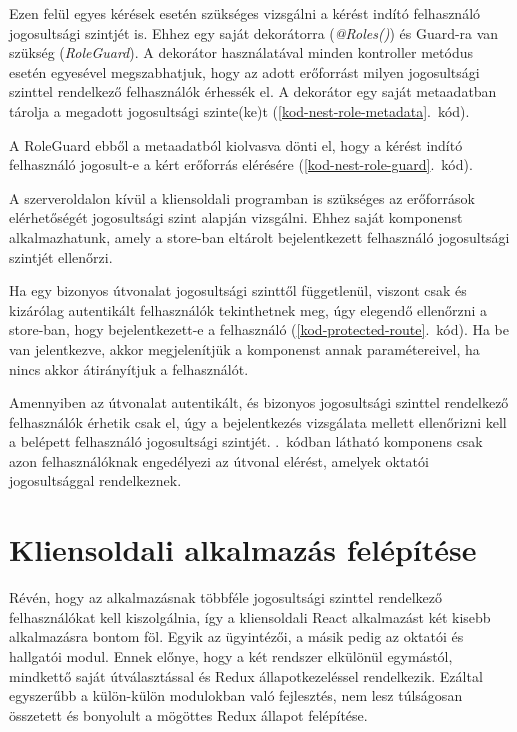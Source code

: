 \documentclass[
]{thesis-ekf}
\theoremstyle{definition}
\theoremstyle{remark}
\begin{document}
	Ezen felül egyes kérések esetén szükséges vizsgálni a kérést indító felhasználó jogosultsági szintjét is. Ehhez egy saját dekorátorra (\emph{@Roles()}) és Guard-ra van szükség (\emph{RoleGuard}). A dekorátor használatával minden kontroller metódus esetén egyesével megszabhatjuk, hogy az adott erőforrást milyen jogosultsági szinttel rendelkező felhasználók érhessék el. A dekorátor egy saját metaadatban tárolja a megadott jogosultsági szinte(ke)t (\ref{kod-nest-role-metadata}.~kód).
	
	
	
	A RoleGuard ebből a metaadatból kiolvasva dönti el, hogy a kérést indító felhasználó jogosult-e a kért erőforrás elérésére (\ref{kod-nest-role-guard}.~kód).
	
	
	
	A szerveroldalon kívül a kliensoldali programban is szükséges az erőforrások elérhetőségét jogosultsági szint alapján vizsgálni. Ehhez saját komponenst alkalmazhatunk, amely a store-ban eltárolt bejelentkezett felhasználó jogosultsági szintjét ellenőrzi.
	
	Ha egy bizonyos útvonalat jogosultsági szinttől függetlenül, viszont csak és kizárólag autentikált felhasználók tekinthetnek meg, úgy elegendő ellenőrzni a store-ban, hogy bejelentkezett-e a felhasználó (\ref{kod-protected-route}.~kód). Ha be van jelentkezve, akkor megjelenítjük a komponenst annak paramétereivel, ha nincs akkor átirányítjuk a felhasználót.
	
	
	
	Amennyiben az útvonalat autentikált, és bizonyos jogosultsági szinttel rendelkező felhasználók érhetik csak el, úgy a bejelentkezés vizsgálata mellett ellenőrizni kell a belépett felhasználó jogosultsági szintjét. \Az{\ref{kod-lecturer-route}}.~kódban látható komponens csak azon felhasználóknak engedélyezi az útvonal elérést, amelyek oktatói jogosultsággal rendelkeznek.
	
	
	
	\section{Kliensoldali alkalmazás felépítése}
	Révén, hogy az alkalmazásnak többféle jogosultsági szinttel rendelkező felhasználókat kell kiszolgálnia, így a kliensoldali React alkalmazást két kisebb alkalmazásra bontom föl. Egyik az ügyintézői, a másik pedig az oktatói és hallgatói modul. Ennek előnye, hogy a két rendszer elkülönül egymástól, mindkettő saját útválasztással és Redux állapotkezeléssel rendelkezik. Ezáltal egyszerűbb a külön-külön modulokban való fejlesztés, nem lesz túlságosan összetett és bonyolult a mögöttes Redux állapot felépítése.
	
\end{document}
